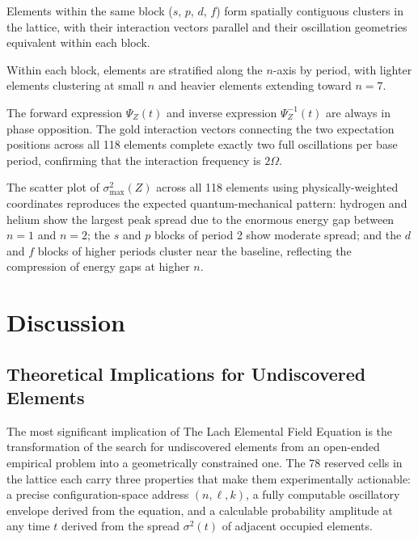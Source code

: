 \documentclass[12pt, a4paper]{article}
\newcommand{\PsiF}{\Psi_{Z}}            %
\newcommand{\PsiI}{\Psi_{Z}^{-1}}       %
\begin{document}
\begin{description}[leftmargin=2em, style=nextline]
  \item[Block coherence]
    Elements within the same block ($s$, $p$, $d$, $f$) form spatially contiguous clusters
    in the lattice, with their interaction vectors parallel and their oscillation geometries
    equivalent within each block.

  \item[Period stratification]
    Within each block, elements are stratified along the $n$-axis by period, with lighter
    elements clustering at small $n$ and heavier elements extending toward $n=7$.

  \item[Inverse phase opposition]
    The forward expression $\PsiF(t)$ and inverse expression $\PsiI(t)$ are always in
    phase opposition. The gold interaction vectors connecting the two expectation
    positions across all 118 elements complete exactly two full oscillations per base
    period, confirming that the interaction frequency is $2\Omega$.

  \item[2D graph coherence]
    The scatter plot of $\sigma^2_{\max}(Z)$ across all 118 elements using
    physically-weighted coordinates reproduces the expected quantum-mechanical pattern:
    hydrogen and helium show the largest peak spread due to the enormous energy gap
    between $n=1$ and $n=2$; the $s$ and $p$ blocks of period 2 show moderate spread;
    and the $d$ and $f$ blocks of higher periods cluster near the baseline, reflecting the
    compression of energy gaps at higher $n$.
\end{description}

\section{Discussion}
\label{sec:discussion}

\subsection{Theoretical Implications for Undiscovered Elements}

The most significant implication of The Lach Elemental Field Equation is the transformation
of the search for undiscovered elements from an open-ended empirical problem into a
geometrically constrained one. The 78 reserved cells in the lattice each carry three
properties that make them experimentally actionable: a precise configuration-space address
$(n, \ell, k)$, a fully computable oscillatory envelope derived from the equation, and a
calculable probability amplitude at any time $t$ derived from the spread $\sigma^2(t)$ of
adjacent occupied elements.
\end{document}
